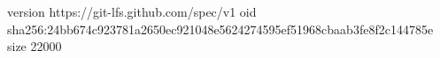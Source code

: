 version https://git-lfs.github.com/spec/v1
oid sha256:24bb674c923781a2650ec921048e5624274595ef51968cbaab3fe8f2c144785e
size 22000
